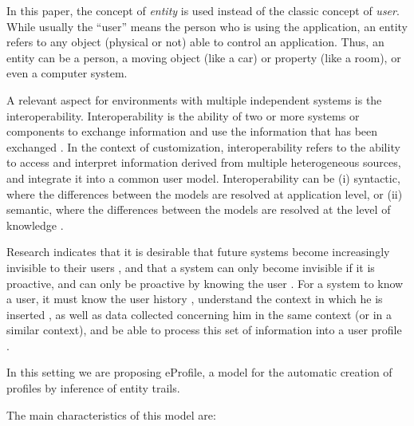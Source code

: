 \documentclass{svjour3}                     %
\begin{document}
In this paper, the concept of {\em entity} is used instead of the classic concept of {\em user}. While usually the ``user'' means the person who is using the application, an entity refers to any object (physical or not) able to control an application.  Thus, an entity can be a person, a moving object (like a car) or property (like a room), or even a computer system. 

A relevant aspect for environments with multiple independent systems is the interoperability. Interoperability is the ability of two or more systems or components to exchange information and use the information that has been exchanged \citep{ieeedict}. In the context of customization, interoperability refers to the ability to access and interpret information derived from multiple heterogeneous sources, and integrate it into a common user model. Interoperability can be (i) syntactic, where the differences between the models are resolved at application level, or (ii) semantic, where the differences between the models are resolved at the level of knowledge \citep{carmagnola09}.

Research indicates that it is desirable that future systems become increasingly invisible to their users \citep{weiser96}, and that a system can only become invisible if it is proactive, and can only be proactive by knowing the user \citep{satyanarayanan01}. For a system to know a user, it must know the user history \citep{silva10}, understand the context in which he is inserted \citep{dey2001}, as well as data collected concerning him in the same context (or in a similar context), and be able to process this set of information into a user profile \citep{fischer01,viviani10}.

In this setting we are proposing eProfile, a model for the automatic creation of profiles by inference of entity trails. %

The main characteristics of this model are:
\end{document}
